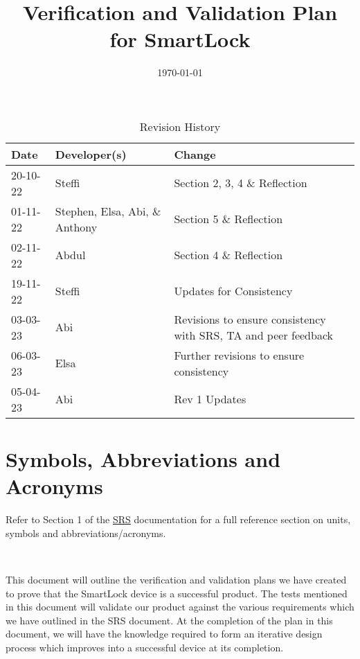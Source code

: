 \documentclass[12pt, titlepage]{article}
\title{Verification and Validation Plan for SmartLock\\\progname}
\author{\authname}
\date{\today}
\begin{document}
	


\maketitle

\newpage


\begin{table}[hp]
\caption{Revision History} \label{TblRevisionHistory}
\begin{tabularx}{\textwidth}{llX}
\toprule
\textbf{Date} & \textbf{Developer(s)} & \textbf{Change}\\
\midrule
20-10-22 & Steffi & Section 2, 3, 4 \& Reflection\\
01-11-22 & Stephen, Elsa, Abi, \& Anthony & Section 5 \& Reflection\\
02-11-22 & Abdul & Section 4 \& Reflection\\
19-11-22 & Steffi & Updates for Consistency\\
03-03-23 & Abi & Revisions to ensure consistency with SRS, TA and peer feedback\\
06-03-23 & Elsa & Further revisions to ensure consistency\\
05-04-23 & Abi & Rev 1 Updates\\
\bottomrule
\end{tabularx}
\end{table}

\newpage

\tableofcontents

\listoftables



\newpage


\section{Symbols, Abbreviations and Acronyms}

Refer to Section 1 of the \href{https://github.com/NevoAbigail/Capstone/blob/main/docs/SRS/SRS.pdf}{SRS} documentation for a full reference section on units, symbols and abbreviations/acronyms.

\-\

This document will outline the verification and validation plans we have created to prove that the SmartLock device is a successful product. The tests mentioned in this document will validate our product against the various requirements which we have outlined in the SRS document. At the completion of the plan in this document, we will have the knowledge required to form an iterative design process which improves into a successful device at its completion. 
\end{document}
